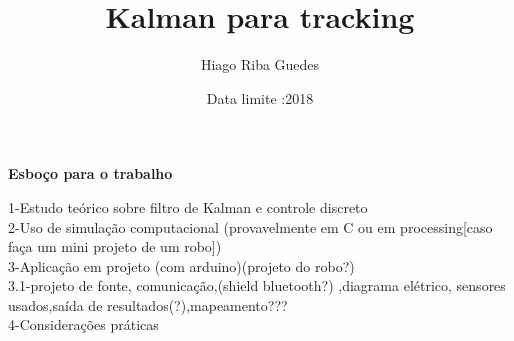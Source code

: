 \documentclass[11pt,a4paper]{article}
\title{Kalman para tracking}
\author{Hiago Riba Guedes }
\date{Data limite :2018}
\begin{document}
\maketitle
\begin{center}
\textbf{Esboço para o trabalho}
\end{center}
1-Estudo teórico sobre filtro de Kalman e controle discreto\\
2-Uso de simulação computacional (provavelmente em C ou em processing[caso faça um mini projeto de um robo]) \\
3-Aplicação em projeto (com arduino)(projeto do robo?)\\
3.1-projeto de fonte, comunicação,(shield bluetooth?) ,diagrama elétrico, sensores usados,saída de resultados(?),mapeamento??? \\
4-Considerações práticas\\
\end{document}
